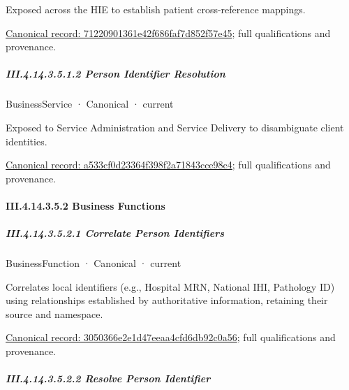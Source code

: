Exposed across the HIE to establish patient cross-reference mappings.


{\footnotesize \href{../../../../continuum/business/business-service/71220901361e42f686faf7d852f57e45.md}{Canonical record: 71220901361e42f686faf7d852f57e45}; full qualifications and provenance.}\par
\subparagraph*{III.4.14.3.5.1.2 Person Identifier Resolution}
\label{navigation:III.4.14.3.5.1.2}

\label{element:a533cf0d23364f398f2a71843cce98c4}
{\small BusinessService · Canonical · current}\par

Exposed to Service Administration and Service Delivery to disambiguate client identities.


{\footnotesize \href{../../../../continuum/business/business-service/a533cf0d23364f398f2a71843cce98c4.md}{Canonical record: a533cf0d23364f398f2a71843cce98c4}; full qualifications and provenance.}\par
\paragraph*{III.4.14.3.5.2 Business Functions}
\label{navigation:III.4.14.3.5.2}

\subparagraph*{III.4.14.3.5.2.1 Correlate Person Identifiers}
\label{navigation:III.4.14.3.5.2.1}

\label{element:3050366e2e1d47eeaa4cfd6db92c0a56}
{\small BusinessFunction · Canonical · current}\par

Correlates local identifiers (e.g., Hospital MRN, National IHI, Pathology ID) using relationships established by authoritative information, retaining their source and namespace.


{\footnotesize \href{../../../../continuum/business/business-function/3050366e2e1d47eeaa4cfd6db92c0a56.md}{Canonical record: 3050366e2e1d47eeaa4cfd6db92c0a56}; full qualifications and provenance.}\par
\subparagraph*{III.4.14.3.5.2.2 Resolve Person Identifier}
\label{navigation:III.4.14.3.5.2.2}

